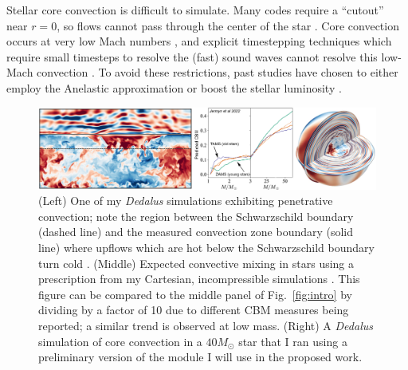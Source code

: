 \documentclass[11pt]{amsart} %
\theoremstyle{definition}
\numberwithin{equation}{section}
\begin{document}
Stellar core convection is difficult to simulate.
Many codes require a ``cutout'' near $r = 0$, so flows cannot pass through the center of the star \citep{edelmann_etal_2019,horst_etal_2020,yadav_etal_2016}.
Core convection occurs at very low Mach numbers \citep[Mach $\sim 10^{-4}$;][]{jermyn_etal_2022_atlas,aerts_etal_2021}, and explicit timestepping techniques which require small timesteps to resolve the (fast) sound waves cannot resolve this low-Mach convection \citep{edelmann_etal_2021}. 
To avoid these restrictions, past studies have chosen to either employ the Anelastic approximation \citep[which is not thermodynamically valid for CBM studies;][]{brown_etal_2012,browning_2008,yadav_etal_2016} or boost the stellar luminosity \citep[which leads to excess CBM for unphysical reasons;][]{baraffe_etal_2021}.


\begin{figure}[t]
     \centering
     \captionsetup{width=0.97\linewidth}
     \includegraphics[width=\textwidth]{fig2.png}
        \caption{(Left) One of my \emph{Dedalus} simulations exhibiting penetrative convection; note the region between the Schwarzschild boundary (dashed line) and the measured convection zone boundary (solid line) where upflows which are hot below the Schwarzschild boundary turn cold \citep{anders_etal_2022a}.
        (Middle) Expected convective mixing in stars using a prescription from my Cartesian, incompressible simulations \citep{jermyn_etal_2022_penconv}. This figure can be compared to the middle panel of Fig.~\ref{fig:intro} by dividing by a factor of 10 due to different CBM measures being reported; a similar trend is observed at low mass.
        (Right) A \emph{Dedalus} simulation of core convection in a $40 M_{\odot}$ star that I ran using a preliminary version of the module I will use in the proposed work.
        \label{fig:cbm}}
\end{figure}
\end{document}
